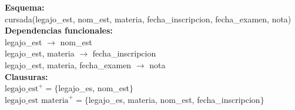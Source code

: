 \documentclass[preview]{standalone}
\begin{document}
\textbf{Esquema:}\\
cursada(legajo\_est, nom\_est, materia, fecha\_inscripcion, fecha\_examen, nota)\\

\textbf{Dependencias funcionales:}\\
legajo\_est $\rightarrow$ nom\_est\\
legajo\_est, materia $\rightarrow$ fecha\_inscripcion\\
legajo\_est, materia, fecha\_examen $\rightarrow$ nota\\

\textbf{Clausuras:}\\
$\text{legajo\_est}^+ = \big\{$legajo\_es, nom\_est$\big\}$\\
$\text{legajo\_est materia}^+ = \big\{$legajo\_es, materia, nom\_est, fecha\_inscripcion$\big\}$\\
\end{document}
